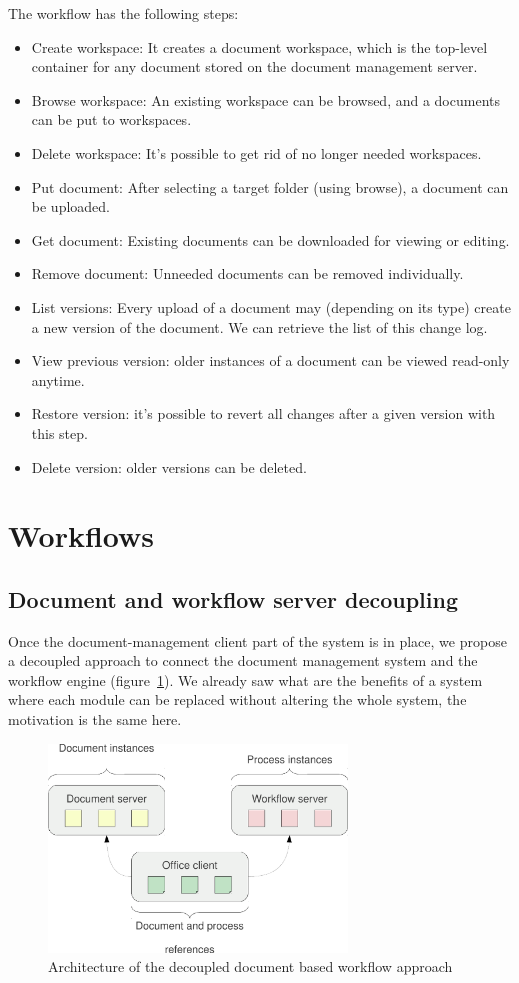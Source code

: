 The workflow has the following steps:

\begin{itemize}
\item Create workspace: It creates a document workspace, which is the top-level
container for any document stored on the document management server.
\item Browse workspace: An existing workspace can be browsed, and a documents
can be put to workspaces.
\item Delete workspace: It's possible to get rid of no longer needed workspaces.
\item Put document: After selecting a target folder (using browse), a document
can be uploaded.
\item Get document: Existing documents can be downloaded for viewing or editing.
\item Remove document: Unneeded documents can be removed individually.
\item List versions: Every upload of a document may (depending on its type)
create a new version of the document. We can retrieve the list of this change log.
\item View previous version: older instances of a document can be viewed
read-only anytime.
\item Restore version: it's possible to revert all changes after a given
version with this step.
\item Delete version: older versions can be deleted.
\end{itemize}

\section{Workflows}

\subsection*{Document and workflow server decoupling}

Once the document-management client part of the system is in place, we propose
a decoupled approach to connect the document management system and the workflow
engine (figure~\ref{fig:decoupled-approach}). We already saw what are the
benefits of a system where each module can be replaced without altering the
whole system, the motivation is the same here.

\begin{figure}[H]
\centering
\includegraphics[width=300px,keepaspectratio]{decoupled-approach.pdf}
\caption{Architecture of the decoupled document based workflow approach}
\label{fig:decoupled-approach}
\end{figure}

